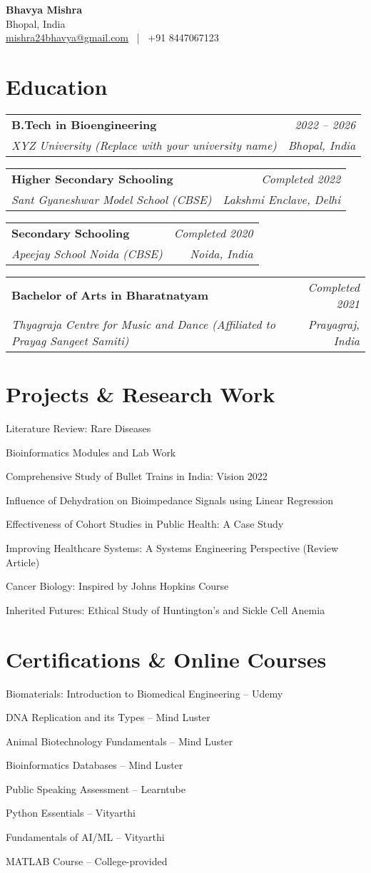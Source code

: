 \documentclass[a4paper,10pt]{article}
\makeatletter
\newcommand{\resumeItem}[1]{\item\small{#1}}
\newcommand{\resumeSubheading}[4]{
  \vspace{-2pt}\item
    \begin{tabular*}{0.97\textwidth}[t]{l@{\extracolsep{\fill}}r}
      \textbf{#1} & \textit{#2} \\
      \textit{#3} & \textit{#4} \\
    \end{tabular*}\vspace{-5pt}
}
\makeatother
\begin{document}
\begin{center}
    \textbf{\Huge Bhavya Mishra} \\[1pt]
    Bhopal, India \\
    \href{mailto:mishra24bhavya@gmail.com}{mishra24bhavya@gmail.com} ~|~ +91 8447067123
\end{center}

\section*{Education}
\resumeSubheading
  {B.Tech in Bioengineering}{2022 -- 2026}
  {XYZ University (Replace with your university name)}{Bhopal, India}

\resumeSubheading
  {Higher Secondary Schooling}{Completed 2022}
  {Sant Gyaneshwar Model School (CBSE)}{Lakshmi Enclave, Delhi}

\resumeSubheading
  {Secondary Schooling}{Completed 2020}
  {Apeejay School Noida (CBSE)}{Noida, India}

\resumeSubheading
  {Bachelor of Arts in Bharatnatyam}{Completed 2021}
  {Thyagraja Centre for Music and Dance (Affiliated to Prayag Sangeet Samiti)}{Prayagraj, India}

\section*{Projects \& Research Work}
\resumeItem{Literature Review: Rare Diseases}
\resumeItem{Bioinformatics Modules and Lab Work}
\resumeItem{Comprehensive Study of Bullet Trains in India: Vision 2022}
\resumeItem{Influence of Dehydration on Bioimpedance Signals using Linear Regression}
\resumeItem{Effectiveness of Cohort Studies in Public Health: A Case Study}
\resumeItem{Improving Healthcare Systems: A Systems Engineering Perspective (Review Article)}
\resumeItem{Cancer Biology: Inspired by Johns Hopkins Course}
\resumeItem{Inherited Futures: Ethical Study of Huntington’s and Sickle Cell Anemia}

\section*{Certifications \& Online Courses}
\resumeItem{Biomaterials: Introduction to Biomedical Engineering – Udemy}
\resumeItem{DNA Replication and its Types – Mind Luster}
\resumeItem{Animal Biotechnology Fundamentals – Mind Luster}
\resumeItem{Bioinformatics Databases – Mind Luster}
\resumeItem{Public Speaking Assessment – Learntube}
\resumeItem{Python Essentials – Vityarthi}
\resumeItem{Fundamentals of AI/ML – Vityarthi}
\resumeItem{MATLAB Course – College-provided}
\end{document}
